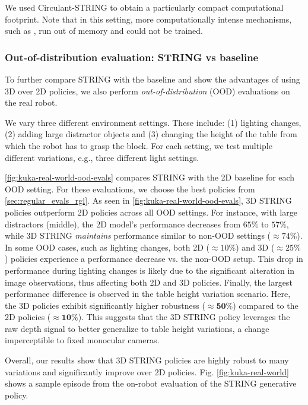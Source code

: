 We used Circulant-STRING to obtain a particularly compact computational footprint. Note that in this setting, more computationally intense mechanisms, such as \cite{ostmeier2024liere}, run out of memory and could not be trained.



\subsubsection{Out-of-distribution evaluation: STRING vs baseline}
To further compare STRING with the baseline and show the 
advantages of using 3D over 2D policies, we also 
perform \textit{out-of-distribution} (OOD) evaluations
on the real robot.

We vary three different environment settings. These include: (1) lighting changes, (2) adding large distractor objects and (3) changing the height of the table from which the robot has to grasp the block. For each setting, we test multiple different variations, e.g., three different light settings. 

\cref{fig:kuka-real-world-ood-evals} compares  STRING with the 2D baseline for each OOD setting.
For these evaluations, we choose the best policies from \cref{sec:regular_evals_rgl}. 
As seen in \cref{fig:kuka-real-world-ood-evals},
3D STRING policies outperform 2D policies across all OOD settings.
For instance, with large distractors (middle), the 2D model's performance decreases from $65\%$ to $57\%$, while 3D STRING \emph{maintains} performance similar to non-OOD settings ($\approx 74\%$).
In some OOD cases, such as lighting changes, both 2D ($\approx 10\%$) and 3D ($\approx 25\%$) policies experience a performance decrease vs. the non-OOD setup.
This drop in performance during lighting changes is likely due to the significant alteration in image observations, thus affecting both 2D and 3D policies.
Finally, the largest performance difference is observed in the table height variation scenario. Here, the 3D policies exhibit significantly higher robustness ($\approx \mathbf{50\%}$) compared to the 2D policies ($\approx \mathbf{10\%}$). This suggests that the 3D STRING policy leverages the raw depth signal to better generalize to table height variations, a change imperceptible to fixed monocular cameras.

Overall, our results show that 3D STRING policies are highly robust to many variations and significantly improve over 2D policies.
Fig. \ref{fig:kuka-real-world} shows a sample episode from the on-robot evaluation of the STRING generative policy.
\newpage


